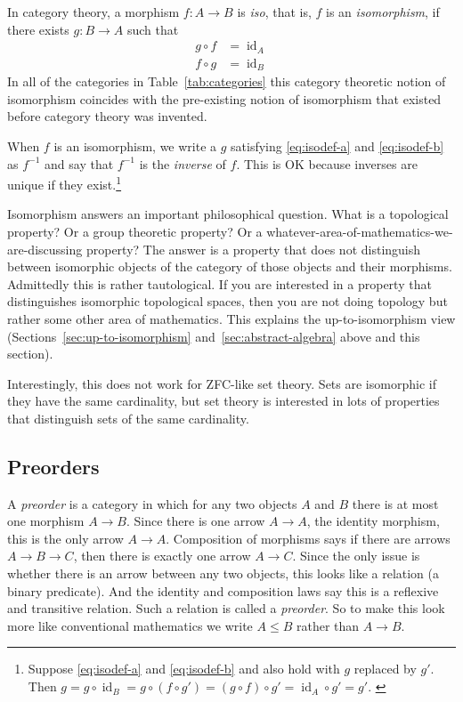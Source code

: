 \documentclass[11pt]{article}
\DeclareMathOperator{\idfun}{id}
\begin{document}
In category theory, a morphism $f : A \to B$ is \emph{iso},
that is, $f$ is an \emph{isomorphism}, if there exists $g : B \to A$ such that
\begin{subequations}
\begin{align}
   g \circ f & = \idfun_A
   \label{eq:isodef-a}
   \\
   f \circ g & = \idfun_B
   \label{eq:isodef-b}
\end{align}
\end{subequations}
In all of the categories in Table~\ref{tab:categories} this category theoretic
notion of isomorphism coincides with the pre-existing notion of isomorphism
that existed before category theory was invented.

When $f$ is an isomorphism, we write a $g$ satisfying \eqref{eq:isodef-a}
and \eqref{eq:isodef-b} as $f^{-1}$ and say that $f^{-1}$ is the \emph{inverse}
of $f$.  This is OK because inverses are unique if they exist.\footnote{Suppose
\eqref{eq:isodef-a} and \eqref{eq:isodef-b} and also hold with $g$ replaced
by $g'$.
Then $g = g \circ \idfun_B = g \circ (f \circ g') = (g \circ f) \circ g'
= \idfun_A \circ g' = g'$.
\label{foot:inverse}}

Isomorphism answers an important philosophical question.  What is a
topological property?  Or a group theoretic property?  Or a
whatever-area-of-mathematics-we-are-discussing property?
The answer is a property that does not distinguish between isomorphic
objects of the category of those objects and their morphisms.
Admittedly this is rather tautological.  If you are interested in a property
that distinguishes isomorphic topological spaces, then you are not doing
topology but rather some other area of mathematics.
This explains the up-to-isomorphism view (Sections~\ref{sec:up-to-isomorphism}
and~\ref{sec:abstract-algebra} above and this section).

Interestingly, this does not work for ZFC-like set theory.
Sets are isomorphic if they have the same cardinality,
but set theory is interested in lots of properties that distinguish
sets of the same cardinality.

\subsection{Preorders}
\label{sec:preorder}

A \emph{preorder} is a category in which for any two objects $A$ and $B$
there is at most one morphism $A \to B$.  Since there is one arrow $A \to A$,
the identity morphism, this is the only arrow $A \to A$.
Composition of morphisms says if there are arrows $A \to B \to C$, then there
is exactly one arrow $A \to C$.  Since the only issue is whether there is
an arrow between any two objects,
this looks like a relation (a binary predicate).
And the identity and composition laws say this is a reflexive and transitive
relation.  Such a relation is called a \emph{preorder}.
So to make this look more like conventional
mathematics we write $A \le B$ rather than $A \to B$.
\end{document}
